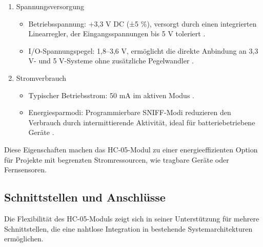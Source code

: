 \begin{enumerate}
	\item Spannungsversorgung 
		\begin{itemize}
			\item Betriebsspannung: +3,3 V DC (±5 \%), versorgt durch einen integrierten Linearregler, der Eingangsspannungen bis 5 V toleriert \cite{ReicheltHC05:2025}.
			\item I/O-Spannungspegel: 1,8–3,6 V, ermöglicht die direkte Anbindung an 3,3 V- und 5 V-Systeme ohne zusätzliche Pegelwandler \cite{HC05Datasheet:2010}.
		\end{itemize}
		
	\item Stromverbrauch 
	
		\begin{itemize}
			\item Typischer Betriebsstrom: 50 mA im aktiven Modus \cite{ReicheltHC05:2025}.
			\item Energiesparmodi: Programmierbare SNIFF-Modi reduzieren den Verbrauch durch intermittierende Aktivität, ideal für batteriebetriebene Geräte \cite{HC05Datasheet:2010}.
		\end{itemize}
\end{enumerate}

Diese Eigenschaften machen das HC-05-Modul zu einer energieeffizienten Option für Projekte mit begrenzten Stromressourcen, wie tragbare Geräte oder Fernsensoren.




\subsection{Schnittstellen und Anschlüsse}

Die Flexibilität des HC-05-Moduls zeigt sich in seiner Unterstützung für mehrere Schnittstellen, die eine nahtlose Integration in bestehende Systemarchitekturen ermöglichen.

